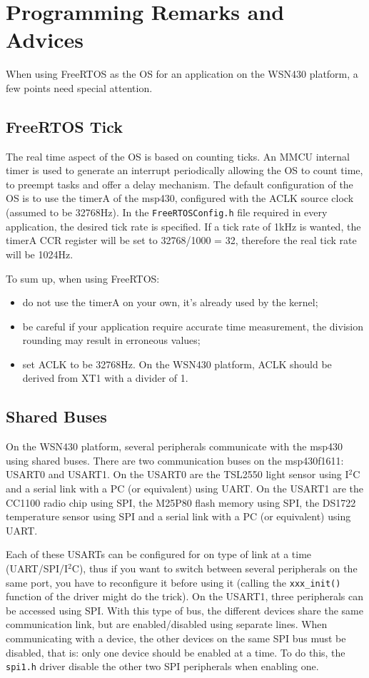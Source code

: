 \documentclass[11pt]{report}
\begin{document}
\section{Programming Remarks and Advices}
When using FreeRTOS as the OS for an application on the WSN430 platform, a few points need special attention.

\subsection{FreeRTOS Tick}
The real time aspect of the OS is based on counting ticks. An MMCU internal timer is used to generate an interrupt periodically allowing the OS to count time, to preempt tasks and offer a delay mechanism. The default configuration of the OS is to use the timerA of the msp430, configured with the ACLK source clock (assumed to be 32768Hz). In the \verb$FreeRTOSConfig.h$ file required in every application, the desired tick rate is specified. If a tick rate of 1kHz is wanted, the timerA CCR register will be set to 32768/1000 = 32, therefore the real tick rate will be 1024Hz.

To sum up, when using FreeRTOS:
\begin{itemize}
	\item do not use the timerA on your own, it's already used by the kernel;
	\item be careful if your application require accurate time measurement, the division rounding may result in erroneous values;
	\item set ACLK to be 32768Hz. On the WSN430 platform, ACLK should be derived from XT1 with a divider of 1.
\end{itemize}

\subsection{Shared Buses}
On the WSN430 platform, several peripherals communicate with the msp430 using shared buses. There are two communication buses on the msp430f1611: USART0 and USART1. On the USART0 are the TSL2550 light sensor using I$^2$C and a serial link with a PC (or equivalent) using UART. On the USART1 are the CC1100 radio chip using SPI, the M25P80 flash memory using SPI, the DS1722 temperature sensor using SPI and a serial link with a PC (or equivalent) using UART.

Each of these USARTs can be configured for on type of link at a time (UART/SPI/I$^2$C), thus if you want to switch between several peripherals on the same port, you have to reconfigure it before using it (calling the \verb$xxx_init()$ function of the driver might do the trick). On the USART1, three peripherals can be accessed using SPI. With this type of bus, the different devices share the same communication link, but are enabled/disabled using separate lines. When communicating with a device, the other devices on the same SPI bus must be disabled, that is: only one device should be enabled at a time. To do this, the \verb$spi1.h$ driver disable the other two SPI peripherals when enabling one.
\end{document}
